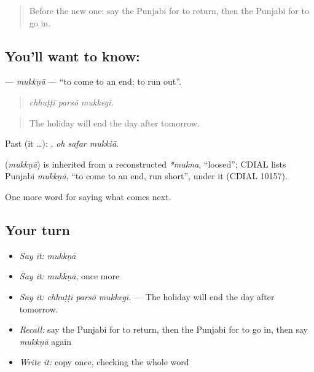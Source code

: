 \label{lesson:PA-C285-mukkna}



\begin{quote}
Before the new one: say the Punjabi for to return, then the Punjabi for to go in.
\end{quote}

\subsection*{You'll want to know: }
\textbf{} — \emph{mukkṇā} — \textquotedblleft{}to come to an end; to run out\textquotedblright{}.

\begin{quote}
  
\end{quote}

\begin{quote}
\emph{chhuṭṭī parsõ mukkegī.}
\end{quote}

\begin{quote}
The holiday will end the day after tomorrow.
\end{quote}

Past (it …):   , \emph{oh safar mukkiā}.

\begin{cousinweb}
\textbf{} (\emph{mukkṇā}) is inherited from a reconstructed \emph{*mukna}, \textquotedblleft{}loosed\textquotedblright{}; CDIAL lists Punjabi \emph{mukkṇā}, \textquotedblleft{}to come to an end, run short\textquotedblright{}, under it (CDIAL 10157).
\end{cousinweb}

\begin{grammarlens}[title={What you've built}]
One more word for saying what comes next.
\end{grammarlens}

\subsection*{Your turn}
\begin{itemize}
\raggedright
  \item \emph{Say it:} \emph{mukkṇā}
  \item \emph{Say it:} \emph{mukkṇā}, once more
  \item \emph{Say it:} \emph{chhuṭṭī parsõ mukkegī.} — The holiday will end the day after tomorrow.
  \item \emph{Recall:} say the Punjabi for to return, then the Punjabi for to go in, then say \emph{mukkṇā} again
  \item \emph{Write it:} copy \textbf{} once, checking the whole word
\end{itemize}

